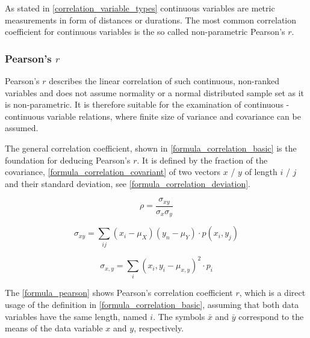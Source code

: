 As stated in \cref{correlation_variable_types} continuous variables are metric measurements in form of distances or durations. The most common correlation coefficient for continuous variables is the so called non-parametric Pearson's $r$.

\subsubsection{Pearson's $r$}

Pearson's $r$ describes the linear correlation of such continuous, non-ranked variables and does not assume normality or a normal distributed sample set as it is non-parametric. It is therefore suitable for the examination of continuous - continuous variable relations, where finite size of variance and covariance can be assumed. \parencite{BenestyChenHuang2009,Sulthan2018}
 
The general correlation coefficient, shown in \cref{formula_correlation_basic} is the foundation for deducing Pearson's $r$. It is defined by the fraction of the covariance, \cref{formula_correlation_covariant} of two vectors $x$ / $y$ of length $i$ / $j$ and their standard deviation, see \cref{formula_correlation_deviation}. \parencite{HerzSchlicherSiegener1992}

\smallskip

\begin{equation}
\label{formula_correlation_basic}
	\rho = \frac{\sigma_{xy}}{\sigma_{x}\sigma_{y}}
\end{equation}

\begin{equation}
\label{formula_correlation_covariant}
	\sigma_{xy} = \sum_{ij}(x_i-\mu_X)(y_n-\mu_Y) \cdot p(x_i,y_j)
\end{equation}

\begin{equation}
\label{formula_correlation_deviation}
	\sigma_{x,y} = \sum_{i}(x_i,y_i-\mu_{x,y})^2 \cdot p_i
\end{equation}

\bigskip

The \cref{formula_pearson} shows Pearson's correlation coefficient $r$, which is a direct usage of the definition in \cref{formula_correlation_basic}, assuming that both data variables have the same length, named $i$. The symbols $\bar{x}$ and $\bar{y}$ correspond to the means of the data variable $x$ and $y$, respectively. \parencite{BenestyChenHuang2009,Zychlinski2018}

\smallskip

